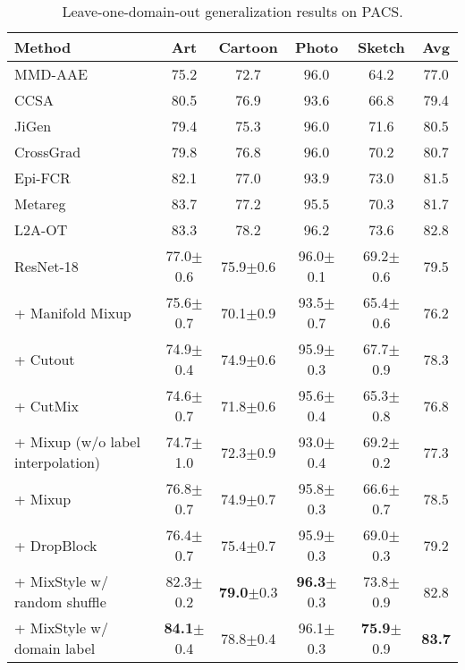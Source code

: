 \documentclass{article} \usepackage{iclr2021_conference,times}
\newcommand{\tableCellHeight}{1}
\newcommand{\tabstyle}[1]{
  \setlength{\tabcolsep}{#1}
  \renewcommand{\arraystretch}{\tableCellHeight}
  \centering
}
\begin{document}
\begin{table}[t]
\tabstyle{6pt}
\caption{Leave-one-domain-out generalization results on PACS.}
\label{tab:result_pacs}
\begin{tabular}{l | c c c c c}
\hline
Method & Art & Cartoon & Photo & Sketch & Avg \\
\hline \hline
MMD-AAE & 75.2 & 72.7 & 96.0 & 64.2 & 77.0 \\
CCSA & 80.5 & 76.9 & 93.6 & 66.8 & 79.4 \\
JiGen & 79.4 & 75.3 & 96.0 & 71.6 & 80.5 \\
CrossGrad & 79.8 & 76.8 & 96.0 & 70.2 & 80.7 \\
Epi-FCR & 82.1 & 77.0 & 93.9 & 73.0 & 81.5 \\
Metareg & 83.7 & 77.2 & 95.5 & 70.3 & 81.7 \\
L2A-OT & {83.3} & {78.2} & {96.2} & {73.6} & {82.8} \\
\hline
ResNet-18 & 77.0$\pm$0.6 & 75.9$\pm$0.6 & 96.0$\pm$0.1 & 69.2$\pm$0.6 & 79.5 \\
+ Manifold Mixup & 75.6$\pm$0.7 & 70.1$\pm$0.9 & 93.5$\pm$0.7 & 65.4$\pm$0.6 & 76.2 \\
+ Cutout & 74.9$\pm$0.4 & 74.9$\pm$0.6 & 95.9$\pm$0.3 & 67.7$\pm$0.9 & 78.3 \\
+ CutMix & 74.6$\pm$0.7 & 71.8$\pm$0.6 & 95.6$\pm$0.4 & 65.3$\pm$0.8 & 76.8 \\
+ Mixup (w/o label interpolation) & 74.7$\pm$1.0 & 72.3$\pm$0.9 & 93.0$\pm$0.4 & 69.2$\pm$0.2 & 77.3 \\
+ Mixup & 76.8$\pm$0.7 & 74.9$\pm$0.7 & 95.8$\pm$0.3 & 66.6$\pm$0.7 & 78.5 \\
+ DropBlock & 76.4$\pm$0.7 & 75.4$\pm$0.7 & 95.9$\pm$0.3 & 69.0$\pm$0.3 & 79.2 \\
+ MixStyle w/ random shuffle & {82.3}$\pm$0.2 & \textbf{79.0}$\pm$0.3 & \textbf{96.3}$\pm$0.3 & {73.8}$\pm$0.9 & {82.8} \\
+ MixStyle w/ domain label & \textbf{84.1}$\pm$0.4 & 78.8$\pm$0.4 & 96.1$\pm$0.3 & \textbf{75.9}$\pm$0.9 & \textbf{83.7} \\
\hline
\end{tabular}
\end{table}
\end{document}
